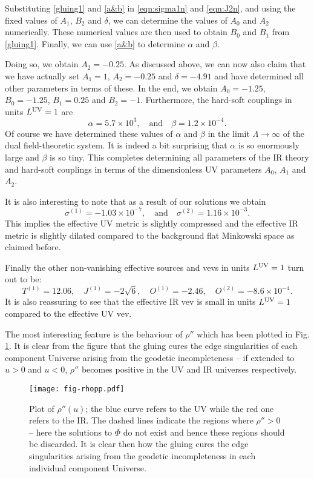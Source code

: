 \documentclass[prd,reprint,a4paper,showpacs,superscriptaddress,11pt,onecolumn,nofootinbib]{revtex4-1}
\newcommand{\be}{\begin{equation}}
\newcommand{\ee}{\end{equation}}
\renewcommand{\(}{\left(}
\renewcommand{\)}{\right)}
\newcommand{\6}{\partial}
\begin{document}
Substituting \eqref{gluing1} and \eqref{a&b} in \eqref{eqn:sigma1n} and \eqref{eqn:J2n}, and using the fixed values of $A_1$, $B_2$ and $\delta$, we can determine the values of $A_0$ and $A_2$ numerically. These numerical values are then used to obtain $B_0$ and $B_1$ from \eqref{gluing1}. Finally, we can use  \eqref{a&b} to determine $\alpha$ and $\beta$. 

Doing so, we obtain $A_2 = -0.25$. As discussed above, we can now also claim that we have actually set $A_1 = 1$, $A_2 = -0.25$ and $\delta = -4.91$ and have determined all other parameters in terms of these. In the end, we obtain $A_0 = -1.25$, $B_0 =-1.25 $, $B_1 = 0.25$ and $B_2 = -1$. Furthermore, the hard-soft couplings in units $L^{\rm UV} = 1$ are 
\be
\alpha = 5.7\times 10^3, \quad \text{and} \quad \beta = 1.2\times 10^{-4}. 
\ee
Of course we have determined these values of $\alpha$ and $\beta$ in the limit $\Lambda \rightarrow \infty$ of the dual field-theoretic system. It is indeed a bit surprising that $\alpha$ is so enormously large and $\beta$ is so tiny. This completes determining all parameters of the IR theory and hard-soft couplings in terms of the dimensionless UV parameters $A_0$, $A_1$ and $A_2$. 

It is also interesting to note that as a result of our solutions we obtain 
\begin{equation}
\sigma^{(1)} = -1.03 \times 10^{-7}, \quad \text{and} \quad\sigma^{(2)} =1.16 \times 10^{-3}.
\end{equation}
This implies the effective UV metric is slightly compressed and the effective IR metric is slightly dilated compared to the background flat Minkowski space as claimed before. 

Finally the other non-vanishing effective sources and vevs in units $L^{\rm UV} = 1$ turn out to be:
\begin{equation}
T^{(1)} = 12.06, \quad J^{(1)} = -2 \sqrt{6},  \quad O^{(1)} = -2.46, \quad O^{(2)} = -8.6 \times 10^{-4}.
\end{equation}
It is also reassuring to see that the effective IR vev is small in units $L^{\rm UV} = 1$ compared to the effective UV vev.  

The most interesting feature is the behaviour of $\rho''$ which has been plotted in Fig. \ref{fig:rhopp}. It is clear from the figure that the gluing cures the edge singularities of each component Universe arising from the geodetic incompleteness -- if extended to $u>0$ and $u<0$, $\rho''$ becomes positive in the UV and IR universes respectively.
\begin{figure}[ht]
\centering
\texttt{[image: fig-rhopp.pdf]}
\caption{\label{fig:rhopp}Plot of $\rho''\left(u\right)$; the blue curve refers to the UV while the red one refers to the IR. The dashed lines indicate the regions where $\rho'' > 0$ -- here the solutions to $\Phi$ do not exist and hence these regions should be discarded. It is clear then how the gluing cures the edge singularities arising from the geodetic incompleteness in each individual component Universe.}
\end{figure}
\end{document}
